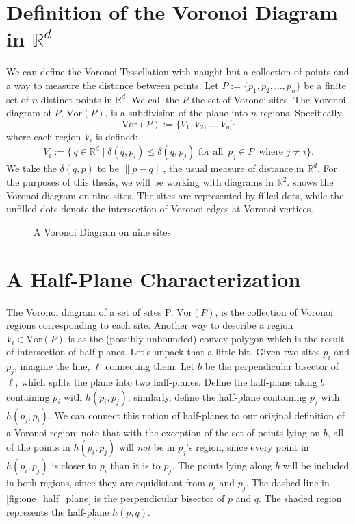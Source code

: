 \documentclass[12pt,twoside]{reedthesis}
\begin{document}
  \section{Definition of the Voronoi Diagram in $\mathds{R}^d$} %
  \label{sec:definition_of_the_voronoi_diagram_in_rd}
    We can define the Voronoi Tessellation with naught but a collection of points and a way to measure the distance between points. Let $P:=\{p_{1}, p_{2},\ldots, p_{n}\}$ be a finite set of $n$ distinct points in $\mathds{R}^d$. We call the $P$ the set of Voronoi sites. The Voronoi diagram of $P$, $\mbox{Vor}(P)$, is a subdivision of the plane into $n$ regions. Specifically, $$\mbox{Vor}(P):=\{V_{1}, V_{2}, \ldots, V_{n}\}$$ where each region $V_{i}$ is defined: 
    $$V_{i} := \{\,q \in \mathds{R}^d \mid \delta(q, p_{i}) \leq \delta(q, p_{j}) \text{ for all }\, p_{j}\in P\,\text{ where }j\neq i \}.$$ We take the $\delta(q, p)$ to be $\lVert p-q \rVert$, the usual measure of distance in $\mathds{R}^d$. 
    For the purposes of this thesis, we will be working with diagrams in $\mathds{R}^2$.  shows the Voronoi diagram on nine sites. The sites are represented by filled dots, while the unfilled dots denote the intersection of Voronoi edges at Voronoi vertices.\par

    \begin{figure}[!htb]
      \centering
      
      \caption{A Voronoi Diagram on nine sites}
      \label{fig:first_sight}
    \end{figure}

  
  \section{A Half-Plane Characterization} %
  \label{sec:half_plane_char}
    The Voronoi diagram of a set of sites P, $\mbox{Vor}(P)$, is the collection of Voronoi regions corresponding to each site. Another way to describe a region $V_{i} \in \mbox{Vor}(P)$ is as the (possibly unbounded) convex polygon which is the result of intersection of half-planes. Let's unpack that a little bit. Given two sites $p_{i}$ and $p_{j}$, imagine the line, $\ell$ connecting them. Let $b$ be the perpendicular bisector of $\ell$, which splits the plane into two half-planes. Define the half-plane along $b$ containing $p_{i}$ with $h(p_{i}, p_{j})$; similarly, define the half-plane containing $p_{j}$ with $h(p_{j}, p_{i})$. We can connect this notion of half-planes to our original definition of a Voronoi region: note that with the exception of the set of points lying on $b$, all of the points in $h(p_{i}, p_{j})$ will \emph{not} be in $p_{j}$'s region, since every point in $h(p_{i}, p_{j})$ is closer to $p_{i}$ than it is to $p_{j}$. The points lying along $b$ will be included in both regions, since they are equidistant from $p_{i}$ and $p_{j}$. The dashed line in \cref{fig:one_half_plane} is the perpendicular bisector of $p$ and $q$. The shaded region represents the half-plane $h(p, q)$.\par
\end{document}
